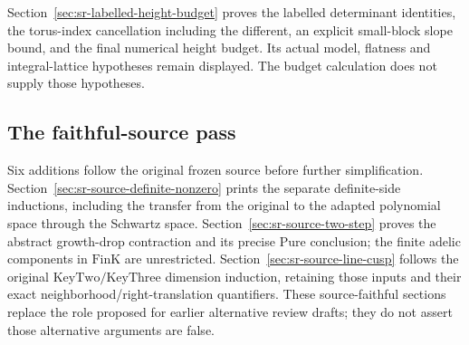 Section~\ref{sec:sr-labelled-height-budget} proves the labelled
determinant identities, the torus-index cancellation including the
different, an explicit small-block slope bound, and the final numerical
height budget. Its actual model, flatness and integral-lattice
hypotheses remain displayed. The budget calculation does not
supply those hypotheses.


\subsection{The faithful-source pass}
Six additions follow the original frozen source before further
simplification. Section~\ref{sec:sr-source-definite-nonzero} prints
the separate definite-side inductions, including the transfer from
the original to the adapted polynomial space through the Schwartz
space. Section~\ref{sec:sr-source-two-step} proves the abstract
growth-drop contraction and its precise \(\mathrm{Pure}\) conclusion;
the finite adelic components in \(\mathrm{FinK}\) are unrestricted.
Section~\ref{sec:sr-source-line-cusp} follows the original
\(\mathrm{KeyTwo}/\mathrm{KeyThree}\) dimension induction, retaining
those inputs and their exact neighborhood/right-translation
quantifiers. These source-faithful sections replace the role
proposed for earlier alternative review drafts; they do not assert
those alternative arguments are false.

